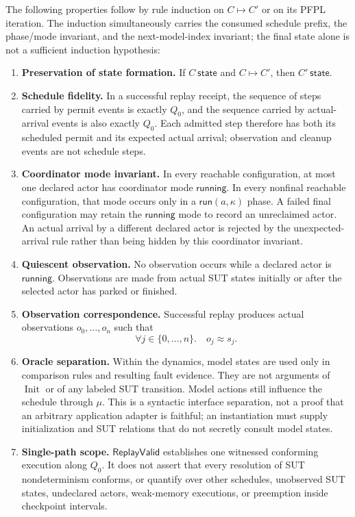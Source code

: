 \documentclass{article}
\newcommand{\Running}{\mathsf{running}}
\newcommand{\Run}{\mathsf{run}}
\newcommand{\matches}{\approx}
\newcommand{\ReplayValid}{\mathsf{ReplayValid}}
\begin{document}
The following properties follow by rule induction on $C\longmapsto C'$ or on
its PFPL iteration. The induction simultaneously carries the consumed schedule
prefix, the phase/mode invariant, and the next-model-index invariant; the final
state alone is not a sufficient induction hypothesis:
\begin{enumerate}
\item \textbf{Preservation of state formation.}
  If $C\ \mathsf{state}$ and $C\longmapsto C'$, then $C'\ \mathsf{state}$.

\item \textbf{Schedule fidelity.}
  In a successful replay receipt, the sequence of steps carried by permit
  events is exactly $Q_0$, and the sequence carried by actual-arrival events is
  also exactly $Q_0$. Each admitted step therefore has both its scheduled
  permit and its expected actual arrival; observation and cleanup events are
  not schedule steps.

\item \textbf{Coordinator mode invariant.}
  In every reachable configuration, at most one declared actor has coordinator
  mode $\Running$. In every nonfinal reachable configuration, that mode occurs
  only in a $\Run(a,\kappa)$ phase. A failed final configuration may retain
  the $\Running$ mode to record an unreclaimed actor. An actual arrival by a
  different declared actor is rejected by the unexpected-arrival rule rather
  than being hidden by this coordinator invariant.

\item \textbf{Quiescent observation.}
  No observation occurs while a declared actor is $\Running$. Observations are
  made from actual SUT states initially or after the selected actor has parked
  or finished.

\item \textbf{Observation correspondence.}
  Successful replay produces actual observations $o_0,\ldots,o_n$ such that
  \[
    \forall j\in\{0,\ldots,n\}.\quad o_j\matches s_j.
  \]

\item \textbf{Oracle separation.}
  Within the dynamics, model states are used only in comparison rules and
  resulting fault evidence. They are not arguments of $\operatorname{Init}$ or
  of any labeled SUT transition. Model actions still influence the schedule
  through $\mu$. This is a syntactic interface separation, not a proof that an
  arbitrary application adapter is faithful; an instantiation must supply
  initialization and SUT relations that do not secretly consult model states.

\item \textbf{Single-path scope.}
  $\ReplayValid$ establishes one witnessed conforming execution along $Q_0$.
  It does not assert that every resolution of SUT nondeterminism conforms, or
  quantify over other schedules, unobserved SUT states, undeclared actors,
  weak-memory executions, or preemption inside checkpoint intervals.
\end{enumerate}
\end{document}
